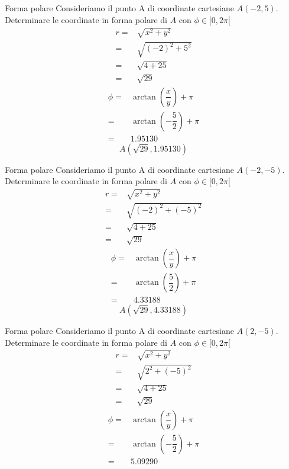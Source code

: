 \begin{esempiot}{Forma polare}{} Consideriamo il punto A di coordinate cartesiane $A(-2,5)$. Determinare le coordinate in forma polare di $A$ con $\phi\in[0,2\pi[$
	\begin{align*}
	r=&\sqrt{x^2+y^2}\\
	=&\sqrt{(-2)^2+5^2}\\
	=&\sqrt{4+25}\\
	=&\sqrt{29}
	\end{align*}
	\begin{align*}
	\phi=&\arctan\left(\dfrac{x}{y}\right)+\pi\\
	=&\arctan\left(-\dfrac{5}{2}\right)+\pi\\
	=&1.95130
	\end{align*}
	\[A(\sqrt{29},1.95130) \]
\end{esempiot}
\begin{esempiot}{Forma polare}{} Consideriamo il punto A di coordinate cartesiane $A(-2,-5)$. Determinare le coordinate in forma polare di $A$ con $\phi\in[0,2\pi[$
	\begin{align*}
	r=&\sqrt{x^2+y^2}\\
	=&\sqrt{(-2)^2+(-5)^2}\\
	=&\sqrt{4+25}\\
	=&\sqrt{29}
	\end{align*}
	\begin{align*}
	\phi=&\arctan\left(\dfrac{x}{y}\right)+\pi\\
	=&\arctan\left(\dfrac{5}{2}\right)+\pi\\
	=&4.33188
	\end{align*}
\[A(\sqrt{29},4.33188) \]
\end{esempiot}
\begin{esempiot}{Forma polare}{} Consideriamo il punto A di coordinate cartesiane $A(2,-5)$. Determinare le coordinate in forma polare di $A$ con $\phi\in[0,2\pi[$
	\begin{align*}
	r=&\sqrt{x^2+y^2}\\
	=&\sqrt{2^2+(-5)^2}\\
	=&\sqrt{4+25}\\
	=&\sqrt{29}
	\end{align*}
	\begin{align*}
	\phi=&\arctan\left(\dfrac{x}{y}\right)+\pi\\
	=&\arctan\left(-\dfrac{5}{2}\right)+\pi\\
	=&5.09290
	\end{align*}
\end{esempiot}
